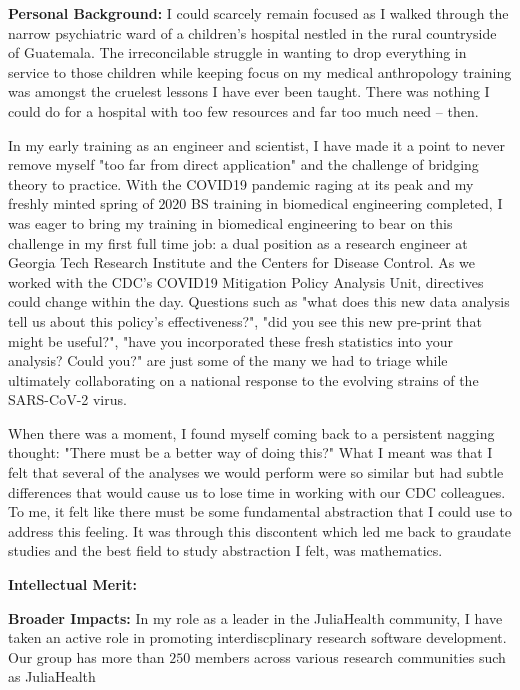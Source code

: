 \documentclass[14pt]{extarticle}
\begin{document}
\textbf{Personal Background:} I could scarcely remain focused as I walked through the narrow psychiatric ward of a children's hospital nestled in the rural countryside of Guatemala.
The irreconcilable struggle in wanting to drop everything in service to those children while keeping focus on my medical anthropology training was amongst the cruelest lessons I have ever been taught.
There was nothing I could do for a hospital with too few resources and far too much need -- then.

In my early training as an engineer and scientist, I have made it a point to never remove myself "too far from direct application" and the challenge of bridging theory to practice.
With the COVID19 pandemic raging at its peak and my freshly minted spring of $2020$ BS training in biomedical engineering completed, I was eager to bring my training in biomedical engineering to bear on this challenge in my first full time job: a dual position as a research engineer at Georgia Tech Research Institute and the Centers for Disease Control.
As we worked with the CDC's COVID19 Mitigation Policy Analysis Unit, directives could change within the day.
Questions such as "what does this new data analysis tell us about this policy's effectiveness?", "did you see this new pre-print that might be useful?", "have you incorporated these fresh statistics into your analysis? Could you?" are just some of the many we had to triage while ultimately collaborating on a national response to the evolving strains of the SARS-CoV-2 virus.

When there was a moment, I found myself coming back to a persistent nagging thought: "There must be a better way of doing this?"
What I meant was that I felt that several of the analyses we would perform were so similar but had subtle differences that would cause us to lose time in working with our CDC colleagues.
To me, it felt like there must be some fundamental abstraction that I could use to address this feeling.
It was through this discontent which led me back to graudate studies and the best field to study abstraction I felt, was mathematics. 

\textbf{Intellectual Merit:}

\textbf{Broader Impacts:} In my role as a leader in the JuliaHealth community, I have taken an active role in promoting interdiscplinary research software development. Our group has more than $250$ members  across various research communities such as JuliaHealth 
\end{document}
